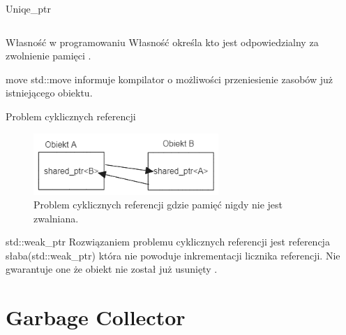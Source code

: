 \documentclass{beamer}
\begin{document}
\begin{frame}{Uniqe\_ptr}

    \inputminted{cpp}{unique_ptr.cpp}
    \begin{block}{Własność w programowaniu}
        Własność określa kto jest odpowiedzialny za zwolnienie pamięci \cite{rust-ownership, cpp-unique-ptr}.
    \end{block}

    \begin{block}{move}
        std::move informuje kompilator o możliwości przeniesienie zasobów już istniejącego obiektu.
    \end{block}
\end{frame}


\begin{frame}{Problem cyklicznych referencji}
    \begin{figure}
        \centering
        \includegraphics[width=7cm]{cyclic_ref.png}
        \caption{Problem cyklicznych referencji gdzie pamięć nigdy nie jest zwalniana.}
        \label{fig:enter-label}
    \end{figure}

\begin{block}{std::weak\_ptr}
    Rozwiązaniem problemu cyklicznych referencji jest referencja słaba(std::weak\_ptr) która nie powoduje inkrementacji licznika referencji. Nie gwarantuje one że obiekt nie został już usunięty \cite{weak-ptr-vs-magazine, cpp-weak-ptr}. 
\end{block}
\end{frame}

\section{Garbage Collector}
\end{document}
